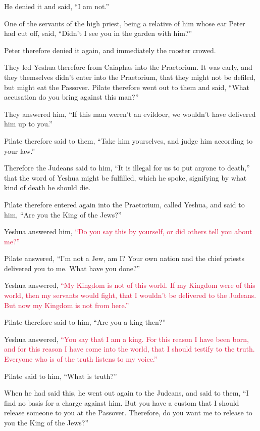 He denied it and said, “I am not.”

\myverse{}One of the servants of the high priest, being a relative of
him whose ear Peter had cut off, said, “Didn’t I see you in the garden with him?”

\myverse{}Peter therefore denied it again, and immediately the rooster
crowed.

\myverse{}They led Yeshua therefore from Caiaphas into the Praetorium.
It was early, and they themselves didn’t enter into the Praetorium, that they might not be defiled, but
might eat the Passover.
\myverse{}Pilate therefore went out to them and said, “What accusation do you bring
against this man?”

\myverse{}They answered him, “If this man weren’t an evildoer, we wouldn’t
have delivered him up to you.”

\myverse{}Pilate therefore said to them, “Take him yourselves, and judge
him according to your law.”

Therefore the Judeans said to him, “It is illegal for us to put anyone to death,”
\myverse{}that the word of Yeshua might be fulfilled, which he spoke, signifying by
what kind of death he should die.

\myverse{}Pilate therefore entered again into the Praetorium, called Yeshua,
and said to him, “Are you the King of the Jews?”

\myverse{}Yeshua answered him,
\textcolor{crimson}{“Do you say this by yourself, or did others tell you about me?”}

\myverse{}Pilate answered, “I’m not a Jew, am I? Your own nation and the
chief priests delivered you to me. What have you done?”

\myverse{}Yeshua answered,
\textcolor{crimson}{“My Kingdom is not of this world. If my Kingdom were of this world, then my servants would fight,
	that I wouldn’t be delivered to the Judeans. But now my Kingdom is not from here.”}

\myverse{}Pilate therefore said to him, “Are you a king then?”

Yeshua answered,
\textcolor{crimson}{“You say that I am a king. For this reason I have been born, and for this reason I have come into
	the world, that I should testify to the truth. Everyone who is of the truth listens to my voice.”}

\myverse{}Pilate said to him, “What is truth?”

When he had said this, he went out again to the Judeans, and said to them, “I find no basis
for a charge against him.
\myverse{}But you have a custom that I should release someone to you at the Passover.
Therefore, do you want me to release to you the King of the Jews?”

